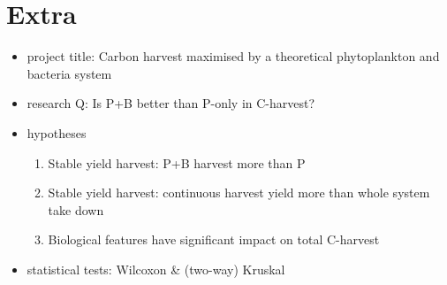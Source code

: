 \documentclass[a4paper,11pt]{article}
\begin{document}
    \section{Extra}
    \begin{itemize}
        \item project title: Carbon harvest maximised by a theoretical phytoplankton and bacteria system
        \item research Q: Is P+B better than P-only in C-harvest?
        \item hypotheses
        \begin{enumerate}
            \item Stable yield harvest: P+B harvest more than P
            \item Stable yield harvest: continuous harvest yield more than whole system take down
            \item Biological features have significant impact on total C-harvest
        \end{enumerate}
        \item statistical tests: Wilcoxon \& (two-way) Kruskal
    \end{itemize}
\end{document}
